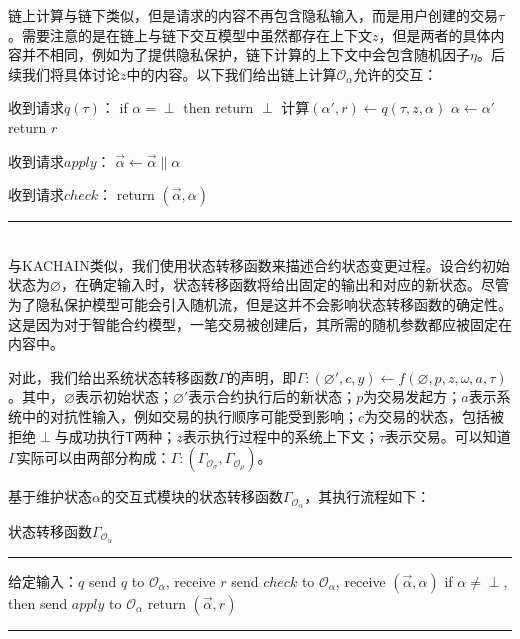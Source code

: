 链上计算与链下类似，但是请求的内容不再包含隐私输入，而是用户创建的交易$\tau$。需要注意的是在链上与链下交互模型中虽然都存在上下文$z$，但是两者的具体内容并不相同，例如为了提供隐私保护，链下计算的上下文中会包含随机因子$\eta$。后续我们将具体讨论$z$中的内容。以下我们给出链上计算$\mathcal{O}_{\alpha}$允许的交互：

\noindent\hrulefill
\begin{description}
\item 收到请求$q(\tau)$：\newline
if $\alpha = \perp$ then return $\perp$\newline
计算$(\alpha', r) \leftarrow q(\tau, z, \alpha)$\newline
$\alpha \leftarrow \alpha'$\newline
return $r$
\item 收到请求$apply$：\newline
$\vec{\alpha} \leftarrow \vec{\alpha} \parallel \alpha$
\item 收到请求$check$：\newline
return $(\vec{\alpha}, \alpha)$
\end{description}
\noindent\hrule
~\\

与KACHAIN\cite{9505181}类似，我们使用状态转移函数来描述合约状态变更过程。设合约初始状态为$\varnothing$，在确定输入时，状态转移函数将给出固定的输出和对应的新状态。尽管为了隐私保护模型可能会引入随机流，但是这并不会影响状态转移函数的确定性。这是因为对于智能合约模型，一笔交易被创建后，其所需的随机参数都应被固定在内容中。

对此，我们给出系统状态转移函数$\Gamma$的声明，即$\Gamma:(\varnothing', c, y) \leftarrow f(\varnothing, p, z, \omega, a, \tau)$。其中，$\varnothing$表示初始状态；$\varnothing'$表示合约执行后的新状态；$p$为交易发起方；$a$表示系统中的对抗性输入，例如交易的执行顺序可能受到影响；$c$为交易的状态，包括被拒绝$\perp$与成功执行$\mathsf{T}$两种；$z$表示执行过程中的系统上下文；$\tau$表示交易。可以知道$\Gamma$实际可以由两部分构成：$\Gamma: (\Gamma_{\mathcal{O}_\sigma}, \Gamma_{\mathcal{O}_\rho})$。

基于维护状态$\alpha$的交互式模块的状态转移函数$\Gamma_{\mathcal{O}_\alpha}$，其执行流程如下：
\begin{center}
    状态转移函数$\Gamma_{\mathcal{O}_\alpha}$
\end{center}
\noindent\hrule
\begin{description}
    \item 给定输入：$q$
    \subitem send $q$ to $\mathcal{O}_\alpha$, receive $r$
    \subitem send $check$ to $\mathcal{O}_\alpha$, receive $(\vec{\alpha}, \alpha)$
    \subitem if $\alpha \neq \perp$, then send $apply$ to $\mathcal{O}_\alpha$
    \subitem return $(\vec{\alpha}, r)$
\end{description}
\noindent\hrule
~\\

